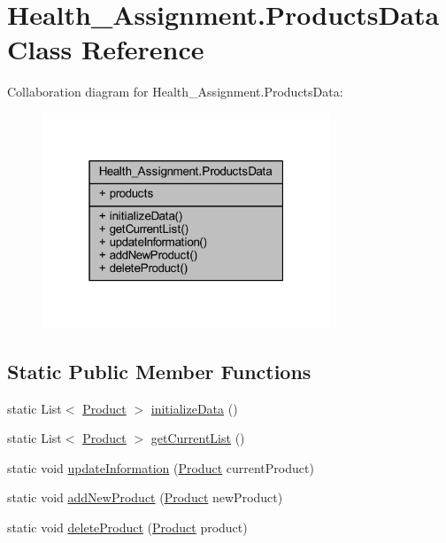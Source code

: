 \hypertarget{class_health___assignment_1_1_products_data}{}\section{Health\+\_\+\+Assignment.\+Products\+Data Class Reference}
\label{class_health___assignment_1_1_products_data}


Collaboration diagram for Health\+\_\+\+Assignment.\+Products\+Data\+:\nopagebreak
\begin{figure}[H]
\begin{center}
\leavevmode
\includegraphics[width=244pt]{class_health___assignment_1_1_products_data__coll__graph}
\end{center}
\end{figure}
\subsection*{Static Public Member Functions}
\begin{DoxyCompactItemize}
\item 
static List$<$ \hyperlink{class_health___assignment_1_1_product}{Product} $>$ \hyperlink{class_health___assignment_1_1_products_data_ab0e36ac827a3a8a5dd22fb388b5e5b0a}{initialize\+Data} ()
\item 
static List$<$ \hyperlink{class_health___assignment_1_1_product}{Product} $>$ \hyperlink{class_health___assignment_1_1_products_data_a6b4b2e06eeb9b3e631921fa21a5f0373}{get\+Current\+List} ()
\item 
static void \hyperlink{class_health___assignment_1_1_products_data_a651063517006e57a6f04588f7c091500}{update\+Information} (\hyperlink{class_health___assignment_1_1_product}{Product} current\+Product)
\item 
static void \hyperlink{class_health___assignment_1_1_products_data_a82d7473f935b4c1e60abe8738c14653a}{add\+New\+Product} (\hyperlink{class_health___assignment_1_1_product}{Product} new\+Product)
\item 
static void \hyperlink{class_health___assignment_1_1_products_data_ad59ae5cd4083b869b356308c1c423960}{delete\+Product} (\hyperlink{class_health___assignment_1_1_product}{Product} product)
\end{DoxyCompactItemize}
